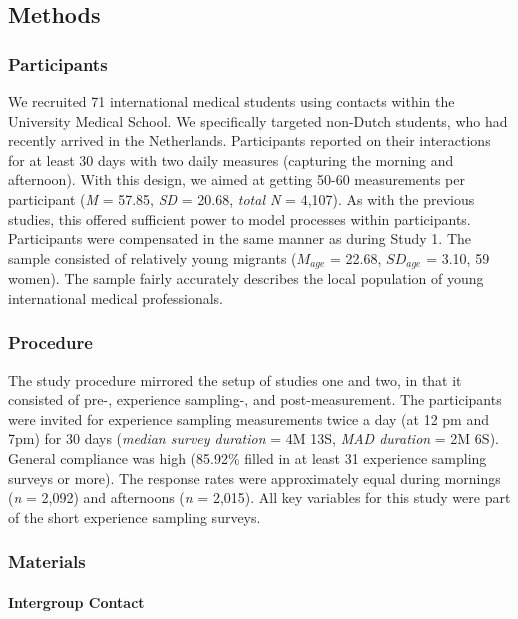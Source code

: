 \subsection{Methods}

\subsubsection{Participants}

We recruited 71 international medical students using contacts within the
University Medical School. We specifically targeted non-Dutch students,
who had recently arrived in the Netherlands. Participants reported on
their interactions for at least 30 days with two daily measures
(capturing the morning and afternoon). With this design, we aimed at
getting 50-60 measurements per participant (\textit{M} = 57.85,
\textit{SD} = 20.68, \textit{total N} = 4,107). As with the previous
studies, this offered sufficient power to model processes within
participants. Participants were compensated in the same manner as during
Study 1. The sample consisted of relatively young migrants (\(M_{age}\)
= 22.68, \(SD_{age}\) = 3.10, 59 women). The sample fairly accurately
describes the local population of young international medical
professionals.

\subsubsection{Procedure}

The study procedure mirrored the setup of studies one and two, in that
it consisted of pre-, experience sampling-, and post-measurement. The
participants were invited for experience sampling measurements twice a
day (at 12 pm and 7pm) for 30 days (\textit{median survey duration} = 4M
13S, \textit{MAD duration} = 2M 6S). General compliance was high
(85.92\% filled in at least 31 experience sampling surveys or more). The
response rates were approximately equal during mornings (\textit{n} =
2,092) and afternoons (\textit{n} = 2,015). All key variables for this
study were part of the short experience sampling surveys.

\subsubsection{Materials}

\paragraph{Intergroup Contact}

